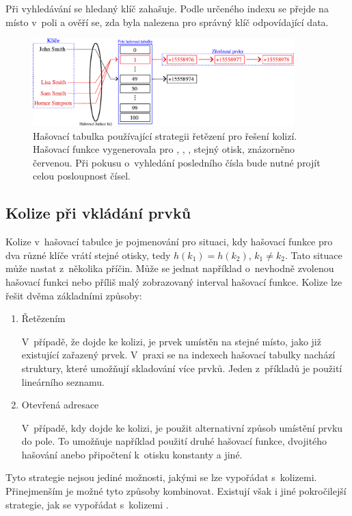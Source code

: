 Při vyhledávání se hledaný klíč zahašuje. Podle určeného indexu se přejde na místo v~poli a ověří se, zda byla nalezena pro správný klíč odpovídající data.


\begin{figure}[t!]
    \centering
    \includegraphics[width=0.9\textwidth]{obrazky-figures/hash/HT_colision.pdf}
    \caption{Hašovací tabulka používající strategii řetězení pro řešení kolizí. Hašovací funkce vygenerovala pro , , , stejný otisk, znázorněno červenou. Při pokusu o~vyhledání posledního čísla bude nutné projít celou posloupnost čísel.
    }
    \label{fig:degradation_ht}
\end{figure}


\subsection*{Kolize při vkládání prvků}
\label{kolize}
Kolize v~hašovací tabulce je pojmenování pro situaci, kdy hašovací funkce pro dva různé klíče vrátí stejné otisky, tedy $h(k_1) = h(k_2)$,  $ k_1 \neq k_2$. Tato situace může nastat z~několika příčin. Může se jednat například o~nevhodně zvolenou hašovací funkci nebo příliš malý zobrazovaný interval hašovací funkce. Kolize lze řešit dvěma základními způsoby:
\begin{enumerate}
    \item Řetězením

    V~případě, že dojde ke kolizi, je prvek umístěn na stejné místo, jako již existující zařazený prvek. V~praxi se na indexech hašovací tabulky nachází struktury, které umožňují skladování více prvků. Jeden z~příkladů je použití lineárního seznamu.
    \item Otevřená adresace
    
    V~případě, kdy dojde ke kolizi, je použit alternativní způsob umístění prvku do pole. To umožňuje například použití druhé hašovací funkce, dvojitého hašování anebo připočtení k~otisku konstanty a jiné.
\end{enumerate}
Tyto strategie nejsou jediné možnosti, jakými se lze vypořádat s~kolizemi. Přinejmenším je možné tyto způsoby kombinovat. Existují však i jiné pokročilejší strategie, jak se vypořádat s~kolizemi \cite{hashtablebench}.

